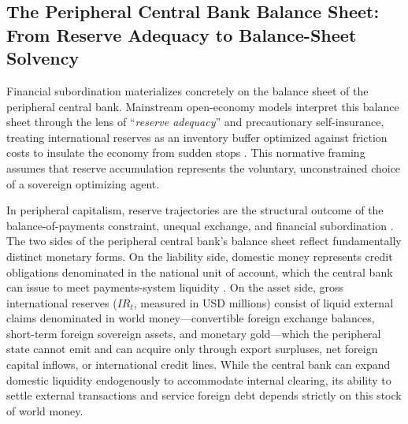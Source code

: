 \subsection{The Peripheral Central Bank Balance Sheet: From Reserve Adequacy to Balance-Sheet Solvency}
\label{sec:B3_levr}

Financial subordination materializes concretely on the balance sheet of the peripheral central bank. Mainstream open-economy models interpret this balance sheet through the lens of ``\textit{reserve adequacy}'' and precautionary self-insurance, treating international reserves as an inventory buffer optimized against friction costs to insulate the economy from sudden stops \citep{Jeanne2007,CespedesChang2024}. This normative framing assumes that reserve accumulation represents the voluntary, unconstrained choice of a sovereign optimizing agent.

In peripheral capitalism, reserve trajectories are the structural outcome of the balance-of-payments constraint, unequal exchange, and financial subordination \citep{Vasudevan2009,Abeles2013}. The two sides of the peripheral central bank's balance sheet reflect fundamentally distinct monetary forms. On the liability side, domestic money represents credit obligations denominated in the national unit of account, which the central bank can issue to meet payments-system liquidity \citep[\S3.2.3]{Basu2022}. On the asset side, gross international reserves ($IR_t$, measured in USD millions) consist of liquid external claims denominated in world money---convertible foreign exchange balances, short-term foreign sovereign assets, and monetary gold---which the peripheral state cannot emit and can acquire only through export surpluses, net foreign capital inflows, or international credit lines. While the central bank can expand domestic liquidity endogenously to accommodate internal clearing, its ability to settle external transactions and service foreign debt depends strictly on this stock of world money. 

